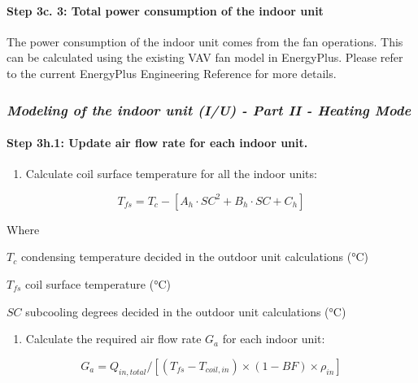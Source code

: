 \paragraph{Step 3c. 3: Total power consumption of the indoor unit}\label{step-3c.-3-total-power-consumption-of-the-indoor-unit}

The power consumption of the indoor unit comes from the fan operations. This can be calculated using the existing VAV fan model in EnergyPlus. Please refer to the current EnergyPlus Engineering Reference for more details.

\subsubsection{\texorpdfstring{\emph{Modeling of the indoor unit (I/U) - Part II - Heating Mode}}{Modeling of the indoor unit (I/U) - Part II - Heating Mode}}\label{modeling-of-the-indoor-unit-iu---part-ii---heating-mode}

\paragraph{Step 3h.1: Update air flow rate for each indoor unit.}\label{step-3h.1-update-air-flow-rate-for-each-indoor-unit.}

\begin{enumerate}
\def\labelenumi{\arabic{enumi})}
\tightlist
\item
  Calculate coil surface temperature for all the indoor units:
\end{enumerate}

\begin{equation}
T_{fs} = T_c-[A_h\cdot SC^2+B_h\cdot SC+C_h]
\end{equation}

Where

\(T_c\) condensing temperature decided in the outdoor unit calculations (°C)

\(T_{fs}\) coil surface temperature (°C)

\(SC\) subcooling degrees decided in the outdoor unit calculations (°C)

\begin{enumerate}
\def\labelenumi{\arabic{enumi})}
\setcounter{enumi}{1}
\tightlist
\item
  Calculate the required air flow rate \(G_a\) for each indoor unit:
\end{enumerate}

\begin{equation}
G_a = Q_{in,total}/[(T_{fs}-T_{coil,in})\times{(1-BF)}\times{\rho_{in}}]
\end{equation}

